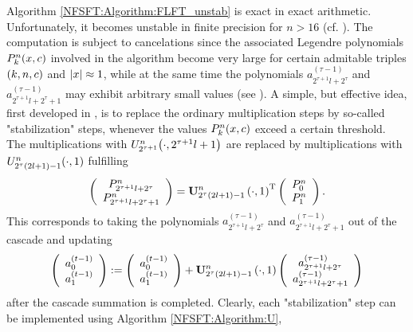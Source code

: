 Algorithm \ref{NFSFT:Algorithm:FLFT_unstab} is exact in exact arithmetic. Unfortunately, it becomes unstable in finite precision for $n > 16$ (cf. \cite{postta97}). The computation is subject to cancelations since the associated Legendre polynomials $P_{k}^n{\hspace{-0.4ex}}\left(x,c\right)$ involved in the algorithm become very large for certain admitable triples $\left(k,n,c\right)$ and $\left\vert x\right\vert \approx 1$, while at the same time the polynomials $a_{2^{\tau+1}l+2^{\tau}}^{(\tau-1)}$ and $a_{2^{\tau+1}l+2^{\tau}+1}^{(\tau-1)}$ may exhibit arbitrary small values (see \cite{kupo02}). A simple, but effective idea, first developed in \cite{postta97}, is to replace the ordinary multiplication steps by so-called "stabilization" steps, whenever the values $P_{k}^n{\hspace{-0.4ex}}\left(x,c\right)$ exceed a certain threshold. The multiplications with $U_{2^{\tau+1}}^n{\hspace{-0.4ex}}\left(\cdot,2^{\tau+1}l+1\right)$ are replaced by multiplications with $U_{2^{\tau}(2l+1)-1}^n{\hspace{-0.4ex}}\left(\cdot,1\right)$ fulfilling
\[
	\left(\begin{array}{c}
	  P_{2^{\tau+1}l+2^{\tau}}^{n}\\ 
	  P_{2^{\tau+1}l+2^{\tau}+1}^{n}
	\end{array}\right)
	=
	\mathbf{U}_{2^{\tau}(2l+1)-1}^{n}\left(\cdot,1\right)^{\text{\rm{T}}}
		\left(\begin{array}{c}
	  P_{0}^{n}\\
	  P_{1}^{n}
	\end{array}\right).
\]
This corresponds to taking the polynomials $a_{2^{\tau+1}l+2^{\tau}}^{(\tau-1)}$ and $a_{2^{\tau+1}l+2^{\tau}+1}^{(\tau-1)}$ out of the cascade and updating
\begin{equation}
  \label{NFSFT:StabilizationStep}
	\left(\begin{array}{c}
	  a_{0}^{(t-1)}\\
	  a_{1}^{(t-1)}
	\end{array}\right)
	:=
	\left(\begin{array}{c}
	  a_{0}^{(t-1)}\\
	  a_{1}^{(t-1)}
	\end{array}\right)
  +
	\mathbf{U}_{2^{\tau}(2l+1)-1}^{n}\left(\cdot,1\right)
	\left(\begin{array}{c}
	  a_{2^{\tau+1}l+2^{\tau}}^{(\tau-1)}\\
	  a_{2^{\tau+1}l+2^{\tau}+1}^{(\tau-1)}
	\end{array}\right)  
\end{equation}
\label{DSFT:Stabilization}
after the cascade summation is completed. Clearly, each "stabilization" step can be implemented using Algorithm \ref{NFSFT:Algorithm:U}, 
